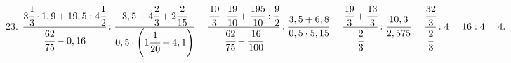 23. $\cfrac{3\cfrac{1}{3}\cdot1,9+19,5:4\cfrac{1}{2}}{\cfrac{62}{75}-0,16}:\cfrac{3,5+4\cfrac{2}{3}+2\cfrac{2}{15}}{0,5\cdot\left(1\cfrac{1}{20}+4,1\right)}=
\cfrac{\cfrac{10}{3}\cdot\cfrac{19}{10}+\cfrac{195}{10}:\cfrac{9}{2}}{\cfrac{62}{75}-\cfrac{16}{100}}:\cfrac{3,5+6,8}{0,5\cdot5,15}=
\cfrac{\cfrac{19}{3}+\cfrac{13}{3}}{\cfrac{2}{3}}:\cfrac{10,3}{2,575}=
\cfrac{\cfrac{32}{3}}{\cfrac{2}{3}}:4=16:4=4.$\\
